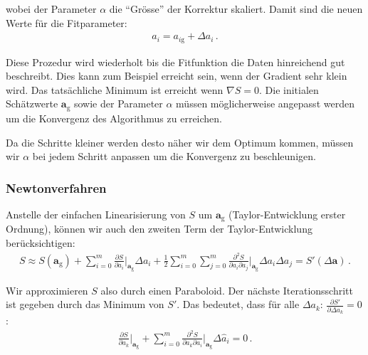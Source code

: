 wobei der Parameter $\alpha$ die ``Gr\"osse'' der Korrektur skaliert. Damit sind die neuen Werte f\"ur die Fitparameter:
\begin{align}
a_i = a_{i\mathrm{g}} + \Delta a_i\,.
\label{eq:vl9-6}
\end{align}

Diese Prozedur wird wiederholt bis die Fitfunktion die Daten hinreichend gut beschreibt. Dies kann zum Beispiel erreicht sein, wenn der Gradient sehr klein wird. Das tats\"achliche Minimum ist erreicht wenn $\nabla S = 0$. Die initialen Sch\"atzwerte $\boldsymbol{a}_\mathrm{g}$ sowie der Parameter $\alpha$ m\"ussen m\"oglicherweise angepasst werden um die Konvergenz des Algorithmus zu erreichen.


\begin{center}
\begin{tcolorbox}[enhanced,width=6in,drop fuzzy shadow southwest,
    colframe=red!50!black,colback=red!05]
   Da die Schritte kleiner werden desto n\"aher wir dem Optimum kommen, m\"ussen wir $\alpha$ bei jedem Schritt anpassen um die Konvergenz zu beschleunigen.
\end{tcolorbox}
\end{center}

\subsubsection{Newtonverfahren}
\label{subsubsec:vl9-2}

Anstelle der einfachen Linearisierung von $S$ um $\boldsymbol{a}_\mathrm{g}$ (Taylor-Entwicklung erster Ordnung), k\"onnen wir auch den zweiten Term der Taylor-Entwicklung ber\"ucksichtigen:
\begin{align}
S \approx S(\boldsymbol{a}_\mathrm{g}) + \sum_{i=0}^m \frac{ \partial S }{ \partial a_i } \bigg|_{\boldsymbol{a}_\mathrm{g}} \Delta a_i + \frac{1}{2} \sum_{i=0}^m \sum_{j=0}^m \frac{ \partial^2 S }{ \partial a_i \partial a_j } \bigg|_{\boldsymbol{a}_\mathrm{g}} \Delta a_i \Delta a_j = S'(\Delta \boldsymbol{a}) \,.
\label{eq:vl9-7}
\end{align}

Wir approximieren $S$ also durch einen Paraboloid. Der n\"achste Iterationsschritt ist gegeben durch das Minimum von $S'$. Das bedeutet, dass f\"ur alle $\Delta a_k \text{: } \frac{ \partial S' }{ \partial \Delta a_k} = 0$:
\begin{align}
\frac{ \partial S }{ \partial a_k } \bigg|_{\boldsymbol{a}_\mathrm{g}} + \sum_{i=0}^m \frac{ \partial^2 S }{ \partial a_k \partial a_i } \bigg|_{\boldsymbol{a}_\mathrm{g}} \Delta \hat{a}_i = 0 \,.
\label{eq:vl9-8}
\end{align}

